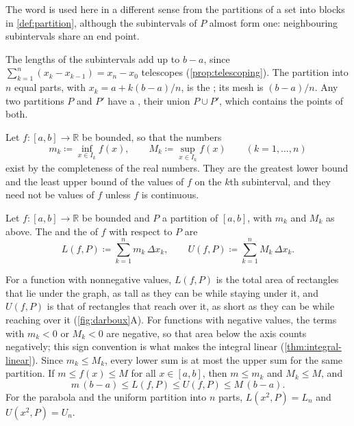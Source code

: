 The word is used here in a different sense from the partitions of a set into blocks in \cref{def:partition}, although the subintervals of $P$ almost form one: neighbouring subintervals share an end point.

The lengths of the subintervals add up to $b-a$, since $\sum_{k=1}^n(x_k-x_{k-1})=x_n-x_0$ telescopes (\cref{prop:telescoping}). The partition into $n$ equal parts, with $x_k=a+k(b-a)/n$, is the ; its mesh is $(b-a)/n$. Any two partitions $P$ and $P'$ have a , their union $P\cup P'$, which contains the points of both.

Let $f\colon[a,b]\to\mathbb R$ be bounded, so that the numbers
\[
m_k\coloneqq\inf_{x\in I_k}f(x),\qquad M_k\coloneqq\sup_{x\in I_k}f(x)\qquad(k=1,\ldots,n)
\]
exist by the completeness of the real numbers. They are the greatest lower bound and the least upper bound of the values of $f$ on the $k$th subinterval, and they need not be values of $f$ unless $f$ is continuous.

\begin{definition}
\label{def:darboux-sums}
Let $f\colon[a,b]\to\mathbb R$ be bounded and $P$ a partition of $[a,b]$, with $m_k$ and $M_k$ as above. The  and the  of $f$ with respect to $P$ are
\[
L(f,P)\coloneqq\sum_{k=1}^nm_k\,\Delta x_k,\qquad U(f,P)\coloneqq\sum_{k=1}^nM_k\,\Delta x_k .
\]
\end{definition}

For a function with nonnegative values, $L(f,P)$ is the total area of rectangles that lie under the graph, as tall as they can be while staying under it, and $U(f,P)$ is that of rectangles that reach over it, as short as they can be while reaching over it (\cref{fig:darboux}A). For functions with negative values, the terms with $m_k<0$ or $M_k<0$ are negative, so that area below the axis counts negatively; this sign convention is what makes the integral linear (\cref{thm:integral-linear}). Since $m_k\le M_k$, every lower sum is at most the upper sum for the same partition. If $m\le f(x)\le M$ for all $x\in[a,b]$, then $m\le m_k$ and $M_k\le M$, and
\begin{equation}
m\,(b-a)\le L(f,P)\le U(f,P)\le M\,(b-a).
\label{eq:darboux-bounds}
\end{equation}
For the parabola and the uniform partition into $n$ parts, $L(x^2,P)=L_n$ and $U(x^2,P)=U_n$.

